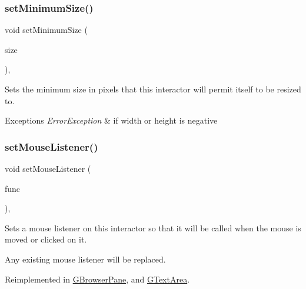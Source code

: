\subsubsection{\texorpdfstring{set\+Minimum\+Size()}{setMinimumSize()}\hspace{0.1cm}{\footnotesize\ttfamily [2/2]}}
{\footnotesize\ttfamily void set\+Minimum\+Size (\begin{DoxyParamCaption}\item[{const \mbox{\hyperlink{structsgl_1_1GDimension}{G\+Dimension}} \&}]{size }\end{DoxyParamCaption})\hspace{0.3cm}{\ttfamily [virtual]}, {\ttfamily [inherited]}}



Sets the minimum size in pixels that this interactor will permit itself to be resized to. 


\begin{DoxyExceptions}{Exceptions}
{\em Error\+Exception} & if width or height is negative \\
\hline
\end{DoxyExceptions}
\mbox{\label{classsgl_1_1GInteractor_a37d8dbc943f59920f705b0104f60bde2}} 
\subsubsection{\texorpdfstring{set\+Mouse\+Listener()}{setMouseListener()}\hspace{0.1cm}{\footnotesize\ttfamily [1/2]}}
{\footnotesize\ttfamily void set\+Mouse\+Listener (\begin{DoxyParamCaption}\item[{\mbox{\hyperlink{namespacesgl_ae9f3e9eab70035da1a2b114e21357b25}{G\+Event\+Listener}}}]{func }\end{DoxyParamCaption})\hspace{0.3cm}{\ttfamily [virtual]}, {\ttfamily [inherited]}}



Sets a mouse listener on this interactor so that it will be called when the mouse is moved or clicked on it. 

Any existing mouse listener will be replaced. 

Reimplemented in \mbox{\hyperlink{classsgl_1_1GBrowserPane_a2c6a3746da7ffa3819294896d4423059}{G\+Browser\+Pane}}, and \mbox{\hyperlink{classsgl_1_1GTextArea_a2c6a3746da7ffa3819294896d4423059}{G\+Text\+Area}}.

